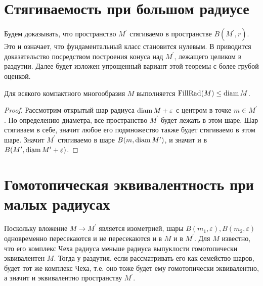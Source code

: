 \documentclass[11pt,twoside
]{article}
\begin{document}
\section{Стягиваемость при большом радиусе}
Будем доказывать, что пространство \( M ^\prime \) стягиваемо в
пространстве \( B(M
^{\prime},r) \). Это и означает, что фундаментальный класс становится
нулевым. В \cite{katz1983filling} приводится доказательство
посредством построения конуса над \( M^\prime \), лежащего целиком в
раздутии. Далее будет изложен упрощенный вариант этой теоремы с более
грубой оценкой.
\begin{theorem}
  Для всякого компактного многообразия \( M \) выполняется \(
  \operatorname{FillRad}(M) \leq \operatorname{diam} M \).
\end{theorem}
\begin{proof}
  Рассмотрим открытый шар радиуса \( \operatorname{diam} M + \varepsilon \) с центром в
  точке \( m \in M^\prime\). По определению диаметра, все
  пространство \( M^\prime \) будет лежать в этом шаре. Шар стягиваем
  в себе, значит любое его подмножество также будет стягиваемо в этом
  шаре. Значит \( M^\prime \) стягиваемо в шаре \( B(m,\operatorname{diam}
  M^\prime) \), и значит и в \( B(M^\prime, \operatorname{diam} M^\prime + \varepsilon) \).
\end{proof}
\section{Гомотопическая эквивалентность при малых радиусах}
Поскольку вложение \( M \rightarrow M^\prime \) является изометрией,
шары \( B(m_1,\varepsilon), B(m_2, \varepsilon )\) одновременно
пересекаются и не пересекаются и в \( M \) и в \( M^\prime \). Для \(
M \) известно, что его комплекс Чеха радиуса меньше радиуса
выпуклости гомотопически эквивалентен \( M \).
Тогда у раздутия, если рассматривать его как семейство шаров, будет
тот же комплекс Чеха, т.е. оно тоже будет ему гомотопически
эквивалентно, а значит и эквивалентно пространству \( M^\prime\).
\printbibliography
\end{document}
